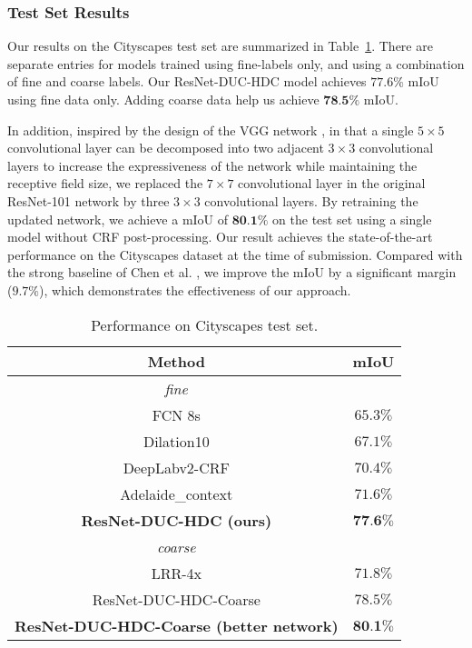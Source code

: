 \documentclass[10pt,twocolumn,letterpaper]{article}
\begin{document}
\subsubsection{Test Set Results}
Our results on the Cityscapes test set are summarized in Table~\ref{table_4}. There are separate entries for models trained using fine-labels only, and using a combination of fine and coarse labels. Our ResNet-DUC-HDC model achieves $77.6\%$ mIoU using fine data only. Adding coarse data help us achieve $\textbf{78.5\%}$ mIoU.

In addition, inspired by the design of the VGG network \cite{simonyan2014very}, in that a single $5\times5$ convolutional layer can be decomposed into two adjacent $3\times3$ convolutional layers to increase the expressiveness of the network while maintaining the receptive field size, we replaced the $7\times 7$ convolutional layer in the original ResNet-101 network by three $3\times3$ convolutional layers. By retraining the updated network, we achieve a mIoU of $\textbf{80.1\%}$ on the test set using a single model without CRF post-processing. Our result achieves the state-of-the-art performance on the Cityscapes dataset at the time of submission. Compared with the strong baseline of Chen et al. \cite{chen2016deeplab}, we improve the mIoU by a significant margin ($9.7\%$), which demonstrates the effectiveness of our approach.

\begin{table}[ht]
\begin{center}
\begin{tabular}{c|c} \toprule[1.5pt]{Method}             &{mIoU}\\ \midrule
    \textit{fine} & \\
   FCN 8s \cite{long2015fully}           & $65.3\%$\\
   Dilation10 \cite{yu2015multi}         & $67.1\%$ \\
   DeepLabv2-CRF \cite{chen2016deeplab}         & $70.4\%$ \\
   Adelaide\_context \cite{lin2015efficient}         & $71.6\%$ \\
   \textbf{ResNet-DUC-HDC (ours)}         & $\textbf{77.6\%}$ \\    \midrule[1.25pt]
   \textit{coarse} & \\
   LRR-4x \cite{ghiasi2016laplacian}           & $71.8\%$ \\
   {ResNet-DUC-HDC-Coarse }       & ${78.5\%}$\\
   \textbf{ResNet-DUC-HDC-Coarse (better network)}       & $\textbf{80.1\%}$\\ \bottomrule[1.5pt]

\end{tabular}
\vspace{2pt}
\caption{Performance on Cityscapes test set.}
\label{table_4}
\vspace{-15pt}
\end{center}
\end{table}
\end{document}
